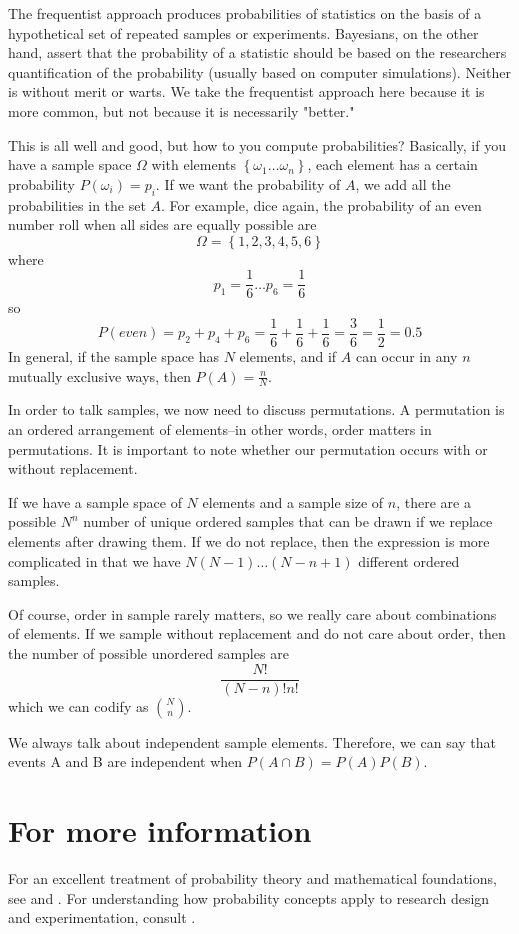 The frequentist approach produces probabilities of statistics on the basis of a hypothetical set of repeated samples or experiments. Bayesians, on the other hand, assert that the probability of a statistic should be based on the researchers quantification of the probability (usually based on computer simulations). Neither is without merit or warts. We take the frequentist approach here because it is more common, but not because it is necessarily "better."

This is all well and good, but how to you compute probabilities? Basically, if you have a sample space $\Omega$ with elements $\left\{\omega_1 \ldots \omega_n\right\}$, each element has a certain probability $P\left(\omega_i\right) = p_i$. If we want the probability of $A$, we add all the probabilities in the set $A$. For example, dice again, the probability of an even number roll when all sides are equally possible are
\[
\Omega = \left\{1,2,3,4,5,6\right\}
\]
where
\[
p_1 = \frac{1}{6}\ldots p_6= \frac{1}{6}
\]
so
\[
P\left(even\right) = p_2+p_4+p_6 = \frac{1}{6}+\frac{1}{6}+\frac{1}{6} = \frac{3}{6} = \frac{1}{2} = 0.5
\]
In general, if the sample space has $N$ elements, and if $A$ can occur in any $n$ mutually exclusive ways, then $P\left(A\right) = \frac{n}{N}$.

In order to talk samples, we now need to discuss permutations. A permutation is an ordered arrangement of elements--in other words, order matters in permutations. It is important to note whether our permutation occurs with or without replacement.

If we have a sample space of $N$ elements and a sample size of $n$, there are a possible $N^n$ number of unique ordered samples that can be drawn if we replace elements after drawing them. If we do not replace, then the expression is more complicated in that we have $N\left(N-1\right)\ldots\left(N-n+1\right)$ different ordered samples.

Of course, order in sample rarely matters, so we really care about combinations of elements. If we sample without replacement and do not care about order, then the number of possible unordered samples are
\begin{equation}
\frac{N!}{\left(N-n\right)!n!}
\end{equation}
which we can codify as ${N \choose n}$.

We always talk about independent sample elements. Therefore, we can say that events A and B are independent when $P\left(A \cap B\right) = P\left(A\right)P\left(B\right)$.
\section*{For more information}
For an excellent treatment of probability theory and mathematical foundations, see \citep{rice2007mathematical} and \citep{gill2006essential}. For understanding how probability concepts apply to research design and experimentation, consult \citep{fisher1973statistical}.
